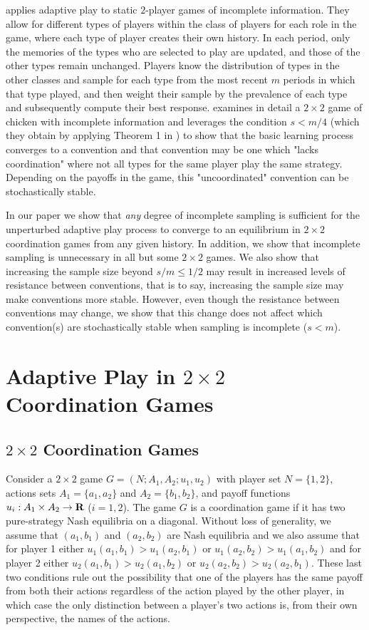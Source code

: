 \cite{jensen2005evolution} applies adaptive play to static $2$-player games of incomplete information. They allow for different types of players within the class of players for each role in the game, where  each type of player creates their own history. In each period, only the memories of the types who are selected to play are updated, and those of the other types remain unchanged. Players know the distribution of types in the other classes and sample for each type from the most recent $m$ periods in which that type played, and then weight their sample by the prevalence of each type and subsequently compute their best response. 
\cite{jensen2005evolution} examines in detail a $2\times 2$ game of chicken with incomplete information and leverages the condition $s<m/4$ (which they obtain by applying Theorem 1 in  \cite{young1993evolution})
to show that the basic learning process converges to a convention and that convention may be one which "lacks coordination" where not all types for the same player play the same strategy. Depending on the payoffs in the game, this "uncoordinated" convention can be stochastically stable. 

In our paper we show that \textit{any} degree of incomplete sampling is sufficient for the unperturbed adaptive play process to converge to an equilibrium in $2\times 2$ coordination games from any given history. In addition, we show that incomplete sampling is unnecessary in all but some $2 \times 2$ games. We also show that increasing the sample size beyond $s/m \leq 1/2$ may result in increased levels of resistance between conventions, that is to say, increasing the sample size may make conventions more stable. However, even though the resistance between conventions may change, we show that this change does not affect which convention(s) are stochastically stable when sampling is incomplete ($s<m$).

\section{Adaptive Play in $2\times 2$ Coordination Games}

\subsection{$2\times 2$ Coordination Games}

Consider a $2\times 2$ game $G=(N;A_1,A_2;u_1, u_2)$ with player set $N=\{1,2\}$, actions sets $A_1=\{a_1,a_2\}$ and $A_2=\{b_1,b_2\}$, and payoff functions $u_i: A_1\times A_2 \rightarrow \bf{R}$ ($i=1,2$). The game $G$ is a coordination game if it has two pure-strategy Nash equilibria on a diagonal. Without loss of generality, we assume that $(a_1,b_1)$ and $(a_2,b_2)$ are Nash equilibria and we also assume that for player 1 either $u_1(a_1,b_1) > u_1(a_2,b_1)$ or $u_1(a_2,b_2) > u_1(a_1,b_2)$ and for player 2 either $u_2(a_1,b_1) > u_2(a_1,b_2)$ or $u_2(a_2,b_2) > u_2(a_2,b_1)$. These last two conditions rule out the possibility that one of the players has the same payoff from both their actions regardless of the action played by the other player, in which case the only distinction between a player's two actions is, from their own perspective, the names of the actions.

